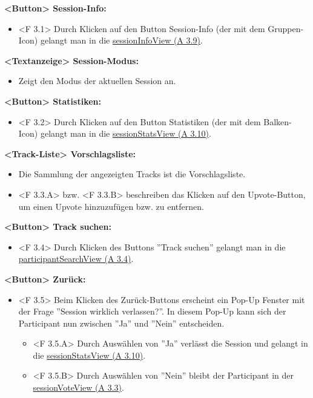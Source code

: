 \documentclass[oneside, ngerman]{sdqtechreport}
\begin{document}
\textbf{<Button> Session-Info:}
\begin{itemize}
    \hypertarget{<F 3.1>}{}
    \item <F 3.1> Durch Klicken auf den Button Session-Info (der mit dem Gruppen-Icon) gelangt man in die \hyperlink{sessionInfoView}{sessionInfoView (A 3.9)}.
\end{itemize}

\textbf{<Textanzeige> Session-Modus:}
\begin{itemize}
    \item Zeigt den Modus der aktuellen Session an.
\end{itemize}

\textbf{<Button> Statistiken:}
\begin{itemize}
    \hypertarget{<F 3.2>}{}
    \item <F 3.2> Durch Klicken auf den Button Statistiken (der mit dem Balken-Icon) gelangt man in die \hyperlink{sessionStatsView}{sessionStatsView (A 3.10)}.
\end{itemize}

\textbf{<Track-Liste> Vorschlagsliste:}
\begin{itemize}
    \item Die Sammlung der angezeigten Tracks ist die Vorschlagsliste.
    \hypertarget{<F 3.3.A>}{} 
    \hypertarget{<F 3.3.B>}{}
    \item <F 3.3.A> bzw. <F 3.3.B> beschreiben das Klicken auf den Upvote-Button, um einen Upvote hinzuzufügen bzw. zu entfernen.
\end{itemize}

\textbf{<Button> Track suchen:}
\begin{itemize}
    \hypertarget{<F 3.4>}{}
    \item <F 3.4> Durch Klicken des Buttons ''Track suchen'' gelangt man in die \hyperlink{participantSearchView}{participantSearchView (A 3.4)}.
\end{itemize}

\textbf{<Button> Zurück:}
\begin{itemize}
    \hypertarget{<F 3.5>}{}
    \item <F 3.5> Beim Klicken des Zurück-Buttons erscheint ein Pop-Up Fenster mit der Frage ''Session wirklich verlassen?''. In diesem Pop-Up kann sich der Participant nun zwischen ''Ja'' und ''Nein'' entscheiden.
    \begin{itemize}
        \hypertarget{<F 3.5.A>}{}
        \item <F 3.5.A> Durch Auswählen von ''Ja'' verlässt die Session und gelangt in die \hyperlink{sessionStatsView}{sessionStatsView (A 3.10)}.
        \item \hypertarget{<F 3.5.B>}{} <F 3.5.B> Durch Auswählen von ''Nein'' bleibt der Participant in der \hyperlink{sessionVoteView}{sessionVoteView (A 3.3)}.
    \end{itemize}
\end{itemize}
\end{document}
